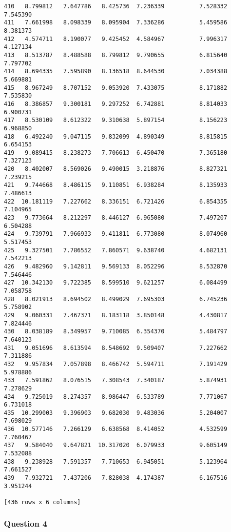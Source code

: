 \documentclass[11pt]{article}
\begin{document}
\begin{Verbatim}[commandchars=\\\{\}]
410   8.799812   7.647786   8.425736  7.236339          7.528332      7.545390
411   7.661998   8.098339   8.095904  7.336286          5.459586      8.381373
412   4.574711   8.190077   9.425452  4.584967          7.996317      4.127134
413   8.513787   8.488588   8.799812  9.790655          6.815640      7.797702
414   8.694335   7.595890   8.136518  8.644530          7.034388      5.669881
415   8.967249   8.707152   9.053920  7.433075          8.171882      7.535830
416   8.386857   9.300181   9.297252  6.742881          8.814033      6.900731
417   8.530109   8.612322   9.310638  5.897154          8.156223      6.968850
418   6.492240   9.047115   9.832099  4.890349          8.815815      6.654153
419   9.089415   8.238273   7.706613  6.450470          7.365180      7.327123
420   8.402007   8.569026   9.490015  3.218876          8.827321      7.239215
421   9.744668   8.486115   9.110851  6.938284          8.135933      7.486613
422  10.181119   7.227662   8.336151  6.721426          6.854355      7.104965
423   9.773664   8.212297   8.446127  6.965080          7.497207      6.504288
424   9.739791   7.966933   9.411811  6.773080          8.074960      5.517453
425   9.327501   7.786552   7.860571  9.638740          4.682131      7.542213
426   9.482960   9.142811   9.569133  8.052296          8.532870      7.546446
427  10.342130   9.722385   8.599510  9.621257          6.084499      7.058758
428   8.021913   8.694502   8.499029  7.695303          6.745236      5.758902
429   9.060331   7.467371   8.183118  3.850148          4.430817      7.824446
430   8.038189   8.349957   9.710085  6.354370          5.484797      7.640123
431   9.051696   8.613594   8.548692  9.509407          7.227662      7.311886
432   9.957834   7.057898   8.466742  5.594711          7.191429      5.978886
433   7.591862   8.076515   7.308543  7.340187          5.874931      7.278629
434   9.725019   8.274357   8.986447  6.533789          7.771067      6.731018
435  10.299003   9.396903   9.682030  9.483036          5.204007      7.698029
436  10.577146   7.266129   6.638568  8.414052          4.532599      7.760467
437   9.584040   9.647821  10.317020  6.079933          9.605149      7.532088
438   9.238928   7.591357   7.710653  6.945051          5.123964      7.661527
439   7.932721   7.437206   7.828038  4.174387          6.167516      3.951244

[436 rows x 6 columns]

    \end{Verbatim}

    \subsubsection{Question 4}\label{question-4}
\end{document}
